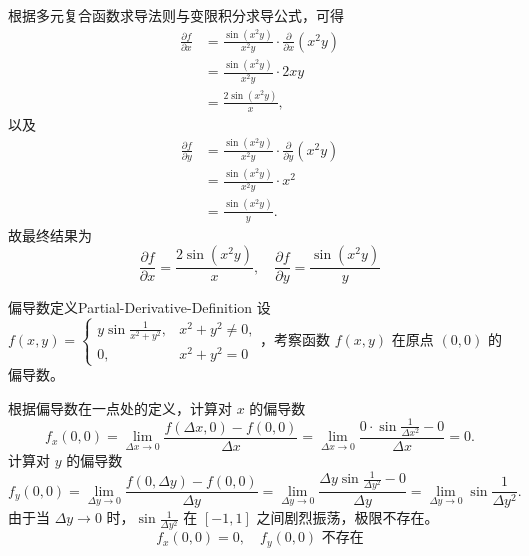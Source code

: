 \begin{solution}
    根据多元复合函数求导法则与变限积分求导公式，可得
    \begin{equation}
        \begin{aligned}
            \frac{\partial f}{\partial x} & = \frac{\sin(x^2 y)}{x^2 y} \cdot \frac{\partial}{\partial x}(x^2 y) \\
                                          & = \frac{\sin(x^2 y)}{x^2 y} \cdot 2xy                                \\
                                          & = \frac{2 \sin(x^2 y)}{x},
        \end{aligned}
    \end{equation}
    以及
    \begin{equation}
        \begin{aligned}
            \frac{\partial f}{\partial y} & = \frac{\sin(x^2 y)}{x^2 y} \cdot \frac{\partial}{\partial y}(x^2 y) \\
                                          & = \frac{\sin(x^2 y)}{x^2 y} \cdot x^2                                \\
                                          & = \frac{\sin(x^2 y)}{y}.
        \end{aligned}
    \end{equation}
    故最终结果为
    \begin{equation}
        \boxed{\frac{\partial f}{\partial x} = \frac{2 \sin(x^2 y)}{x}, \quad \frac{\partial f}{\partial y} = \frac{\sin(x^2 y)}{y}}
    \end{equation}
\end{solution}


\begin{problem}{偏导数定义}{Partial-Derivative-Definition}
    设 $f(x, y) = \begin{cases} y \sin \frac{1}{x^2+y^2}, & x^2 + y^2 \neq 0, \\ 0, & x^2 + y^2 = 0 \end{cases}$，考察函数 $f(x, y)$ 在原点 $(0, 0)$ 的偏导数。
\end{problem}

\begin{solution}
    根据偏导数在一点处的定义，计算对 $x$ 的偏导数
    \begin{equation}
        f_x(0, 0) = \lim_{\Delta x \to 0} \frac{f(\Delta x, 0) - f(0, 0)}{\Delta x} = \lim_{\Delta x \to 0} \frac{0 \cdot \sin \frac{1}{\Delta x^2} - 0}{\Delta x} = 0.
    \end{equation}
    计算对 $y$ 的偏导数
    \begin{equation}
        f_y(0, 0) = \lim_{\Delta y \to 0} \frac{f(0, \Delta y) - f(0, 0)}{\Delta y} = \lim_{\Delta y \to 0} \frac{\Delta y \sin \frac{1}{\Delta y^2} - 0}{\Delta y} = \lim_{\Delta y \to 0} \sin \frac{1}{\Delta y^2}.
    \end{equation}
    由于当 $\Delta y \to 0$ 时，$\sin \frac{1}{\Delta y^2}$ 在 $[-1, 1]$ 之间剧烈振荡，极限不存在。
    \begin{equation}
        \boxed{f_x(0, 0) = 0, \quad f_y(0, 0) \text{ 不存在}}
    \end{equation}
\end{solution}



